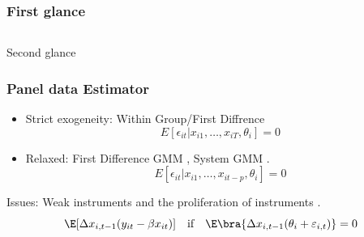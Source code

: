 \documentclass[10pt,mathserif,aspectratio=169]{beamer}
\begin{document}
\begin{frame}
  \frametitle{First glance}
  \begin{columns}[T,T]
    \makebox[\textwidth][c]{
      \fontsize{5pt}{5pt} \selectfont
      }

    \makebox[\textwidth][c]{
      \fontsize{5pt}{5pt} \selectfont
      }

  \end{columns}
\end{frame}

\begin{frame}[label=reg_sep]{Second glance}
  \begin{table}
    \fontsize{6pt}{6pt}\selectfont
    
  \end{table}
  \hyperlink{output}{}
\end{frame}

\begin{frame}
  \frametitle{Panel data Estimator}
  \begin{itemize}\itemsep=12pt
    \item Strict exogeneity: Within Group/First Diffrence
          \begin{equation*}
            E[\epsilon_{it}|x_{i1},\ldots, x_{iT},\theta_i]=0
          \end{equation*}
    \item Relaxed: First Difference GMM \citep{arellano1991some}, System GMM
          \citep{arellano1995another,blundell1998initial}.
          \begin{equation*}
            E[\epsilon_{it}|x_{i1},\ldots, x_{it-p},\theta_i]=0
          \end{equation*}
  \end{itemize}

  Issues: Weak instruments \citep{blundell_bond_1998} and the proliferation of
  instruments \citep{roodman2007short}.
  \begin{equation*}
    \E[\Delta x_{i,t-1}(y_{it}-\beta x_{it})] \quad \text{if}\quad \E\bra{\Delta x_{i,t-1}(\theta_i+\varepsilon_{i,t})}=0
  \end{equation*}
\end{frame}
\end{document}
